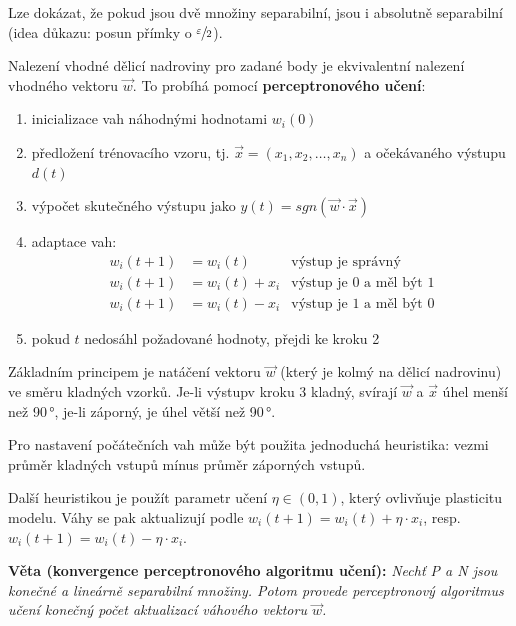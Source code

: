 \documentclass[11pt]{report} %
\begin{document}
Lze dokázat, že pokud jsou dvě množiny separabilní, jsou i absolutně separabilní (idea důkazu: posun přímky o $\sfrac{\varepsilon}{2}$).

Nalezení vhodné dělicí nadroviny pro zadané body je ekvivalentní nalezení vhodného vektoru $\vec{w}$. To probíhá pomocí \textbf{perceptronového učení}:
\begin{enumerate}
	\leftskip 40pt
	\setlength{\itemsep}{0pt}
	\item inicializace vah náhodnými hodnotami $w_i(0)$
	\item předložení trénovacího vzoru, tj. $\vec{x} = (x_1, x_2,\dots,x_n)$ a očekávaného výstupu $d(t)$
	\item výpočet skutečného výstupu jako $y(t) = sgn(\vec{w}\cdot\vec{x})$
	\item adaptace vah:
	\begin{align*}
		w_i(t+1)& = w_i(t)			& \text{výstup je správný}\\
		w_i(t+1)& = w_i(t) + x_i	& \text{výstup je 0 a měl být 1}\\
		w_i(t+1)& = w_i(t) - x_i	& \text{výstup je 1 a měl být 0}
	\end{align*}
	\item pokud $t$ nedosáhl požadované hodnoty, přejdi ke kroku 2
\end{enumerate}

Základním principem je natáčení vektoru $\vec{w}$ (který je kolmý na dělicí nadrovinu) ve směru kladných vzorků. Je-li výstupv kroku 3 kladný, svírají $\vec{w}$ a $\vec{x}$ úhel menší než 90\,°, je-li záporný, je úhel větší než 90\,°. 

Pro nastavení počátečních vah může být použita jednoduchá heuristika: vezmi průměr kladných vstupů mínus průměr záporných vstupů.

Další heuristikou je použít parametr učení $\eta \in (0,1)$, který ovlivňuje plasticitu modelu. Váhy se pak aktualizují podle $w_i(t+1) = w_i(t) + \eta\cdot x_i$, resp. $w_i(t+1) = w_i(t) - \eta\cdot x_i$.

\medskip\noindent\textbf{Věta (konvergence perceptronového algoritmu učení):} \textit{Nechť P a N jsou konečné a lineárně separabilní množiny. Potom provede perceptronový algoritmus učení konečný počet aktualizací váhového vektoru $\vec{w}$.}
\end{document}
